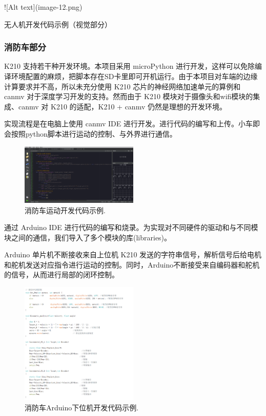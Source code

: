 \documentclass[12pt, a4paper, oneside]{article}
\begin{document}
![Alt text](image-12.png)

无人机开发代码示例（视觉部分）

\subsubsection{消防车部分}


K210 支持若干种开发环境。本项目采用 microPython 进行开发，这样可以免除编译环境配置的麻烦，把脚本存在SD卡里即可开机运行。由于本项目对车端的边缘计算要求并不高，所以未充分使用 K210 芯片的神经网络加速单元的算例和 canmv 对于深度学习开发的支持。然而由于 K210 模块对于摄像头和wifi模块的集成、canmv 对 K210 的适配，K210 + canmv 仍然是理想的开发环境。

实现流程是在电脑上使用 canmv IDE 进行开发。进行代码的编写和上传。小车即会按照python脚本进行运动的控制、与外界进行通信。

\begin{figure}[H]
    \centering
    \includegraphics[width=0.5\textwidth]{872c699ad55fe13ea9324a12a8a9b0d.png}
    \caption{消防车运动开发代码示例.}
    \label{消防车运动开发代码示例}
\end{figure}


通过 Arduino IDE 进行代码的编写和烧录。为实现对不同硬件的驱动和与不同模块之间的通信，我们导入了多个模块的库(libraries)。

Arduino 单片机不断接收来自上位机 K210 发送的字符串信号，解析信号后给电机和舵机发送对应指令进行运动的控制。同时，Arduino不断接受来自编码器和舵机的信号，从而进行局部的闭环控制。

\begin{figure}[H]
    \centering
    \includegraphics[width=0.5\textwidth]{image-11.png}
    \caption{消防车Arduino下位机开发代码示例.}
    \label{消防车Arduino下位机开发代码示例}
\end{figure}
\end{document}
